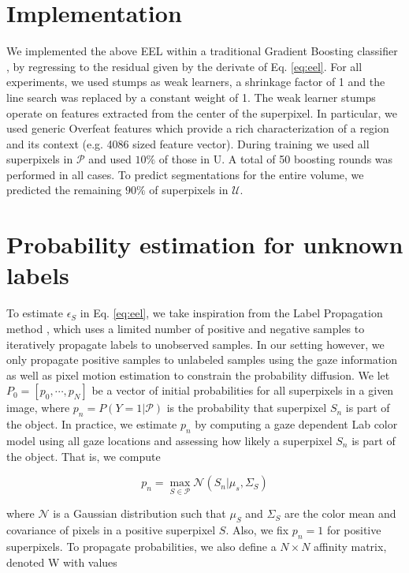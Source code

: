 \section{Implementation}
We implemented the above EEL within a traditional Gradient Boosting classifier \cite{hastie09},
by regressing to the residual given by the derivate of Eq. \ref{eq:eel}.
For all experiments, we used stumps as weak learners, a shrinkage factor of 1 and the line search was replaced by a constant weight of 1.
The weak learner stumps operate on features extracted from the center of the superpixel.
In particular, we used generic Overfeat features \cite{sermanet13} which provide a rich
characterization of a region and its context (e.g. 4086 sized feature vector).
During training we used all superpixels in $\mathcal{P}$ and used $10\%$ of those in U.
A total of 50 boosting rounds was performed in all cases.
To predict segmentations for the entire volume, we
predicted the remaining $90\%$ of superpixels in $\mathcal{U}$.

\section{Probability estimation for unknown labels}
\label{sec:eel_estim}
To estimate $\epsilon_{S}$ in Eq. \ref{eq:eel}, we take inspiration from the Label Propagation method \cite{zhou04}, which uses a limited number of positive and negative samples to iteratively propagate labels to unobserved samples.
In our setting however, we only propagate positive samples to unlabeled
samples using the gaze information as well as pixel motion estimation to constrain the probability diffusion.
We let $P_{0} = \left[p_0,\cdots, p_{N}\right]$ be a vector of initial probabilities for all superpixels in a given image, where $p_n = P(Y = 1|\mathcal{P})$ is the probability that superpixel $S_{n}$ is part of the object.
In practice, we estimate $p_{n}$ by computing a gaze dependent Lab color model using all gaze
locations and assessing how likely a superpixel $S_{n}$ is part of the object.
That is, we compute

\begin{equation}
  p_{n} = \max_{S \in \mathcal{P}} \mathcal{N}(S_{n}|\mu_{s},\Sigma_{S})
  \end{equation}

  where $\mathcal{N}$ is a Gaussian distribution such that $\mu_{S}$ and $\Sigma_{S}$ are the color mean and covariance of pixels in a positive superpixel $S$.
  Also, we fix $p_{n}=1$ for positive superpixels.
  To propagate probabilities, we also define a $N \times N$ affinity matrix, denoted W
with values

